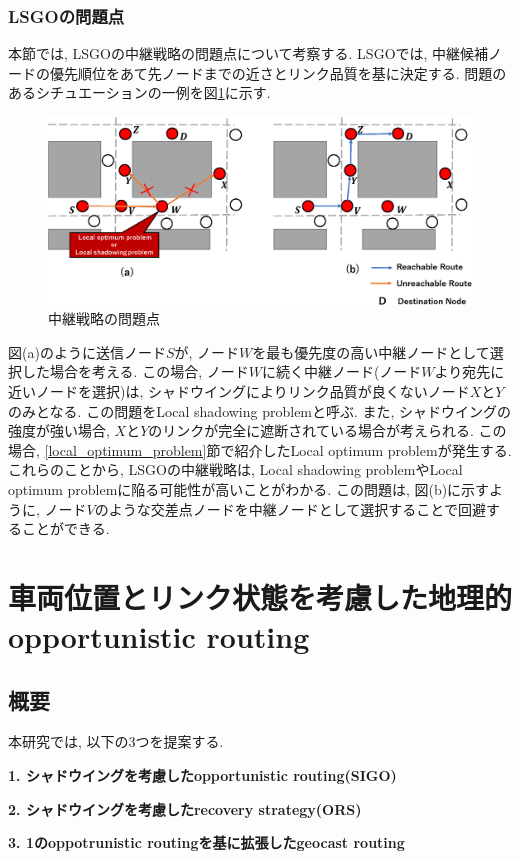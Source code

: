 \documentclass[10pt]{jreport}
\begin{document}
\subsection{LSGOの問題点}
本節では, LSGOの中継戦略の問題点について考察する. LSGOでは, 中継候補ノードの優先順位をあて先ノードまでの近さとリンク品質を基に決定する. 問題のあるシチュエーションの一例を図\ref{fig:LSGO-problem}に示す. 

\begin{figure}[!ht]
	\centering
	\includegraphics[width=160mm]{figures/LSGO_problem.eps}
	\caption{中継戦略の問題点}
	\label{fig:LSGO-problem}
\end{figure}

図(a)のように送信ノード$S$が, ノード$W$を最も優先度の高い中継ノードとして選択した場合を考える. この場合, ノード$W$に続く中継ノード(ノード$W$より宛先に近いノードを選択)は, シャドウイングによりリンク品質が良くないノード$X$と$Y$のみとなる. この問題をLocal shadowing problemと呼ぶ. また, シャドウイングの強度が強い場合, $X$と$Y$のリンクが完全に遮断されている場合が考えられる. この場合, \ref{local_optimum_problem}節で紹介したLocal optimum problemが発生する. これらのことから, LSGOの中継戦略は, Local shadowing problemやLocal optimum problemに陥る可能性が高いことがわかる. この問題は, 図(b)に示すように, ノード$V$のような交差点ノードを中継ノードとして選択することで回避することができる. 





\chapter{車両位置とリンク状態を考慮した地理的opportunistic routing}
\section{概要}
本研究では, 以下の3つを提案する. \par
\textbf{1. シャドウイングを考慮したopportunistic routing(SIGO)} \par
\textbf{2. シャドウイングを考慮したrecovery strategy(ORS)} \par
\textbf{3. 1のoppotrunistic routingを基に拡張したgeocast routing} \par
\end{document}
